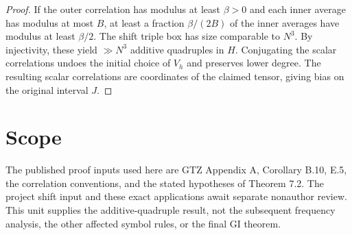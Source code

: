 \documentclass[11pt]{article}
\begin{document}
\begin{proof}
If the outer correlation has modulus at least $\beta>0$ and
each inner average has modulus at most $B$, at least a fraction
$\beta/(2B)$ of the inner averages have modulus at least
$\beta/2$. The shift triple box has size comparable to $N^3$.
By injectivity, these yield $\gg N^3$ additive quadruples in $H$.
Conjugating the scalar correlations undoes the initial choice of
$V_h$ and preserves lower degree. The resulting scalar correlations
are coordinates of the claimed tensor, giving bias on the
original interval $J$.
\end{proof}

\section{Scope}
The published proof inputs used here are GTZ Appendix A, Corollary
B.10, E.5, the correlation conventions, and the stated
hypotheses of Theorem 7.2. The project shift input and these exact
applications await separate nonauthor review. This unit supplies the
additive-quadruple result, not the subsequent frequency analysis,
the other affected symbol rules, or the final GI theorem.
\end{document}
